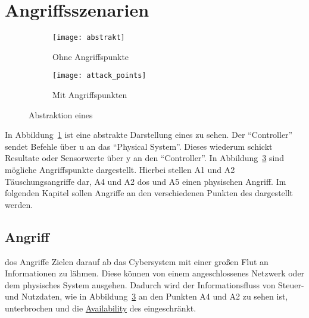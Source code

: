 
\section{Angriffsszenarien}\label{sec:angriffszenarien}

\begin{figure}
    \centering
    \begin{subfigure}[b]{0.3\textwidth}
        \texttt{[image: abstrakt]}
        \caption{Ohne Angriffspunkte}
        \label{fig:abstrakt}
    \end{subfigure}
    \qquad
    \begin{subfigure}[b]{0.4\textwidth}
        \texttt{[image: attack\_points]}
        \caption{Mit Angriffspunkten}
        \label{fig:attack_points}
    \end{subfigure}
    \caption{Abstraktion eines \cps~\cite{CAS08}}
\end{figure}

In Abbildung~\ref{fig:abstrakt} ist eine abstrakte Darstellung eines \cps zu sehen.
Der \enquote{Controller} sendet Befehle über u an das \enquote{Physical System}.
Dieses wiederum schickt Resultate oder Sensorwerte über y an den \enquote{Controller}.
In Abbildung~\ref{fig:attack_points} sind mögliche Angriffspunkte dargestellt.
Hierbei stellen A1 und A2 Täuschungsangriffe dar, A4 und A2 \gls{dos} und A5 einen physischen Angriff.
Im folgenden Kapitel sollen Angriffe an den verschiedenen Punkten des \cps dargestellt werden.

\subsection{ Angriff}\label{subsec:dos}

\gls{dos} Angriffe Zielen darauf ab das Cybersystem mit einer großen Flut an Informationen zu lähmen.
Diese können von einem angeschlossenes Netzwerk oder dem physisches System ausgehen.
Dadurch wird der Informationsfluss von Steuer- und Nutzdaten, wie in Abbildung~\ref{fig:attack_points} an den Punkten A4 und A2 zu sehen ist, unterbrochen und die \hyperref[def:availability]{Availability} des \cps eingeschränkt.

